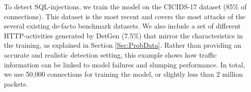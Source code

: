 \documentclass[runningheads]{llncs}
\begin{document}



To detect SQL-injections, we train the model on the CICIDS-17 dataset \cite{sharafaldin2018toward} (85\% of connections).
This dataset is the most recent and covers the most attacks of the several existing de-facto benchmark datasets. We also include a set of different HTTP-activities generated by DetGen (7.5\%) that mirror the characteristics in the training, as explained in Section \ref{Sec:ProbData}. Rather than providing an accurate and realistic detection setting, this example shows how traffic information can be linked to model failures and slumping performance. In total, we use 50,000 connections for training the model, or slightly less than 2 million packets.
\end{document}

